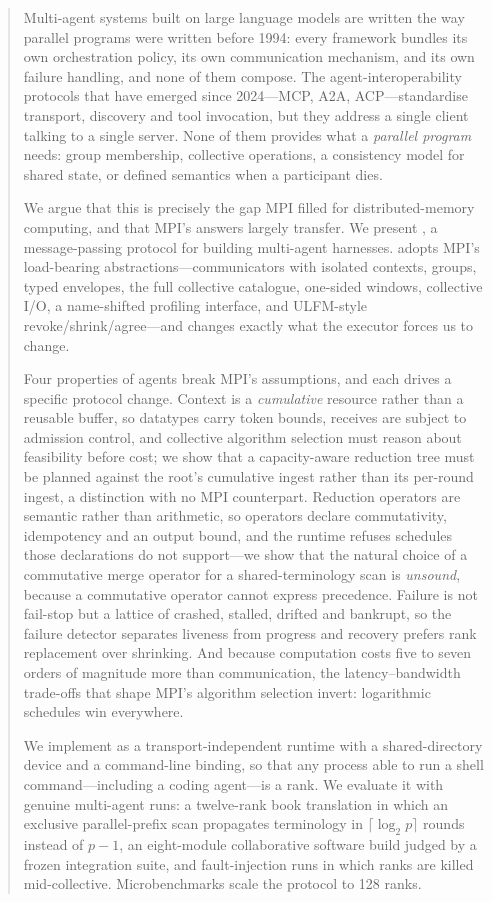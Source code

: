 \begin{abstract}
Multi-agent systems built on large language models are written the way
parallel programs were written before 1994: every framework bundles its own
orchestration policy, its own communication mechanism, and its own failure
handling, and none of them compose. The agent-interoperability protocols
that have emerged since 2024---MCP, A2A, ACP---standardise transport,
discovery and tool invocation, but they address a single client talking to a
single server. None of them provides what a \emph{parallel program} needs:
group membership, collective operations, a consistency model for shared
state, or defined semantics when a participant dies.

We argue that this is precisely the gap MPI filled for distributed-memory
computing, and that MPI's answers largely transfer. We present \ampi{}, a
message-passing protocol for building multi-agent harnesses. \ampi{} adopts
MPI's load-bearing abstractions---communicators with isolated contexts,
groups, typed envelopes, the full collective catalogue, one-sided windows,
collective I/O, a name-shifted profiling interface, and ULFM-style
revoke/shrink/agree---and changes exactly what the executor forces us to
change.

Four properties of agents break MPI's assumptions, and each drives a
specific protocol change. Context is a \emph{cumulative} resource rather
than a reusable buffer, so datatypes carry token bounds, receives are
subject to admission control, and collective algorithm selection must reason
about feasibility before cost; we show that a capacity-aware reduction tree
must be planned against the root's cumulative ingest rather than its
per-round ingest, a distinction with no MPI counterpart. Reduction operators
are semantic rather than arithmetic, so operators declare commutativity,
idempotency and an output bound, and the runtime refuses schedules those
declarations do not support---we show that the natural choice of a
commutative merge operator for a shared-terminology scan is
\emph{unsound}, because a commutative operator cannot express precedence.
Failure is not fail-stop but a lattice of crashed, stalled, drifted and
bankrupt, so the failure detector separates liveness from progress and
recovery prefers rank replacement over shrinking. And because computation
costs five to seven orders of magnitude more than communication, the
latency--bandwidth trade-offs that shape MPI's algorithm selection invert:
logarithmic schedules win everywhere.

We implement \ampi{} as a transport-independent runtime with a shared-directory
device and a command-line binding, so that any process able to run a shell
command---including a coding agent---is a rank. We evaluate it with genuine
multi-agent runs: a twelve-rank book translation in which an exclusive
parallel-prefix scan propagates terminology in $\lceil\log_2 p\rceil$ rounds
instead of $p-1$, an eight-module collaborative software build judged by a
frozen integration suite, and fault-injection runs in which ranks are killed
mid-collective. Microbenchmarks scale the protocol to 128 ranks.
\end{abstract}
